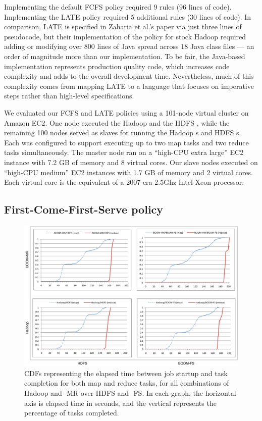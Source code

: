 Implementing the default FCFS policy required 9 rules (96 lines of code).
Implementing the LATE policy required 5 additional \OVERLOG rules (30 lines of
code).  In comparison, LATE is specified in Zaharia et al.'s paper via just
three lines of pseudocode, but their implementation of the policy for stock
Hadoop required adding or modifying over $800$ lines of Java spread across $18$
Java class files --- an order of magnitude more than our \OVERLOG
implementation.  To be fair, the Java-based implementation represents
production quality code, which increases code complexity and adds to the
overall development time.  Nevertheless, much of this complexity comes from
mapping LATE to a language that focuses on imperative steps rather than
high-level specifications.

We evaluated our FCFS and LATE \OVERLOG policies using a 101-node virtual
cluster on Amazon EC2.  One node executed the Hadoop \JT and the HDFS \NN,
while the remaining 100 nodes served as slaves for running the Hadoop {\TT}s
and HDFS {\DN}s.  Each {\TT} was configured to support executing up to two map
tasks and two reduce tasks simultaneously.  The master node ran on a ``high-CPU
extra large'' EC2 instance with 7.2 GB of memory and 8 virtual cores.  Our
slave nodes executed on ``high-CPU medium'' EC2 instances with 1.7 GB of memory
and 2 virtual cores.  Each virtual core is the equivalent of a 2007-era 2.5Ghz
Intel Xeon processor.


\subsection{First-Come-First-Serve policy}

\begin{figure}
\ssp
\centering
	\includegraphics[scale=0.75]{figures/fourgraphs}
\caption{CDFs representing the elapsed time between job startup and task
  completion for both map and reduce tasks, for all combinations of Hadoop and \BOOM-MR
  over HDFS and \BOOM-FS\@.  In each graph, the horizontal axis is
  elapsed time in seconds, and the vertical represents the percentage of tasks completed.}
\label{fig:ec2experiment}
\end{figure}

